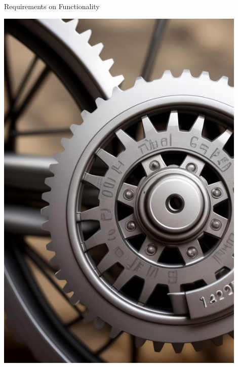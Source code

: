\documentclass{simpleslides}
\begin{document}
\begin{frame}[fragile]{Requirements on Functionality}
\begin{minipage}[t]{0.3\textwidth}
\hfill\includegraphics[width=0.9\textwidth]{img/cogs}
\end{minipage}%
\end{frame}
\end{document}
